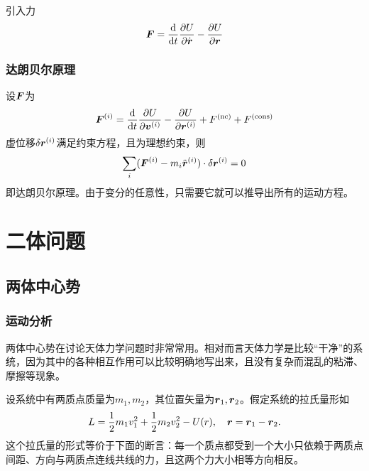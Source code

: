 引入力
\begin{equation}
    \vb*{F} = \dv{t} \pdv{U}{\dot{\vb*{r}}} - \pdv{U}{\vb*{r}}
\end{equation}

\subsection{达朗贝尔原理}

设$\vb*{F}$为
\begin{equation}
    \vb*{F}^{(i)} = \dv{t} \pdv{U}{\vb*{v}^{(i)}} - \pdv{U}{\vb*{r}^{(i)}} + F^\text{(nc)} + F^\text{(cons)}
\end{equation}
虚位移$\var{\vb*{r}^{(i)}}$满足约束方程，且为理想约束，则
\begin{equation}
    \sum_i (\vb*{F}^{(i)} - m_i \ddot{\vb*{r}}^{(i)}) \cdot \var{\vb*{r}^{(i)}} = 0
\end{equation}
即达朗贝尔原理。由于变分的任意性，只需要它就可以推导出所有的运动方程。

\chapter{二体问题}

\section{两体中心势}\label{sec:two-body}

\subsection{运动分析}

两体中心势在讨论天体力学问题时非常常用。相对而言天体力学是比较“干净”的系统，因为其中的各种相互作用可以比较明确地写出来，且没有复杂而混乱的粘滞、摩擦等现象。

设系统中有两质点质量为$m_1,m_2$，其位置矢量为$\vb*{r}_1, \vb*{r}_2$。假定系统的拉氏量形如
\begin{equation}
    L = \frac{1}{2} m_1 v_1^2 + \frac{1}{2} m_2 v_2^2 - U(r), \quad \vb*{r} = \vb*{r}_1 - \vb*{r}_2.
    \label{eq:two-body-original}
\end{equation}
这个拉氏量的形式等价于下面的断言：每一个质点都受到一个大小只依赖于两质点间距、方向与两质点连线共线的力，且这两个力大小相等方向相反。


